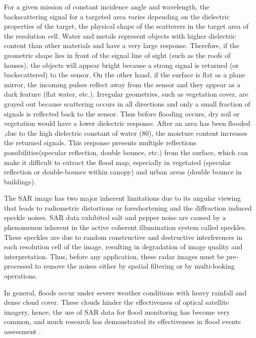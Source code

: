 For a given mission of constant incidence angle and wavelength, the backscattering signal for a targeted area varies depending on the dielectric properties of the target, the physical shape of the scatterers in the target area of the resolution cell\cite{farr1993radar}. Water and metals represent objects with higher dielectric content than other materials and have a very large response. Therefore, if the geometric shape lies in front of the signal line of sight (such as the roofs of houses), the objects will appear bright because a strong signal is returned (or backscattered) to the sensor. On the other hand, if the surface is flat as a plane mirror, the incoming pulses reflect away from the sensor and they appear as a dark feature (flat water, etc.). Irregular geometries, such as vegetation cover, are grayed out because scattering occurs in all directions and only a small fraction of signals is reflected back to the sensor. Thus before flooding occurs, dry soil or vegetation would have a lower dielectric response. After an area has been flooded ,due to the high dielectric constant of water (80), the moisture content increases the returned signals. This response presents multiple reflections possibilities(specular reflection, double bounce, etc.) from the surface, which can make it difficult to extract the flood map, especially in vegetated (specular reflection or double-bounce within canopy) and urban areas (double bounce in buildings).

The SAR image has two major inherent limitations due to its angular viewing that leads to radiometric distortions or foreshortening and the diffraction induced speckle noises. SAR data exhibited salt and pepper noise are caused by a phenomenon inherent in the active coherent illumination system called speckles. These speckles are due to random constructive and destructive interferences in each resolution cell of the image, resulting in degradation of image quality and interpretation. Thus, before any application, these radar images must be pre-processed to remove the noises either by spatial filtering or by multi-looking operations\cite{argenti2013tutorial}.

In general, floods occur under severe weather conditions with heavy rainfall and dense cloud cover. These clouds hinder the effectiveness of optical satellite imagery\cite{sanyal2004}, hence, the use of SAR data for flood monitoring has become very common\cite{rao2006advantage}, and much research has demonstrated its effectiveness in flood events assessment \cite{martinez2007mapping}.

